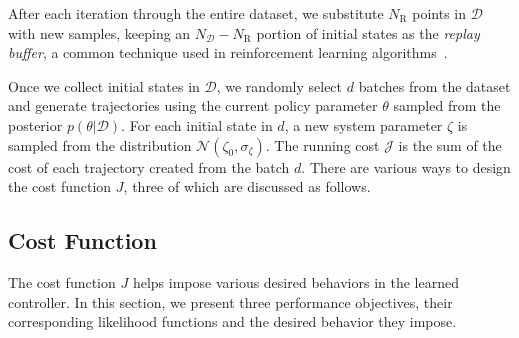 After each iteration through the entire dataset, we substitute $N_{\textrm{R}}$
points in $\mathcal{D}$ with new samples, keeping an $N_\mathcal{D} -
N_\textrm{R}$ portion of initial states as the \textit{replay buffer}, a common
technique used in reinforcement learning algorithms~\cite{lin1992self}.

Once we collect initial states in $\mathcal{D}$, we randomly select $d$ batches
from the dataset and generate trajectories using the current policy parameter
$\theta$ sampled from the posterior $p(\theta | \mathcal{D})$. For each initial
state in $d$, a new system parameter $\zeta$ is sampled from the distribution
$\mathcal{N}(\zeta_0, \sigma_\zeta)$. The running cost $\mathcal{J}$ is the sum
of the cost of each trajectory created from the batch $d$. There are various
ways to design the cost function $J$, three of which are discussed as follows.

\subsection{Cost Function}
\label{ssec:cost}

The cost function $J$ helps impose various desired behaviors in the learned
controller. In this section, we present three performance objectives, their
corresponding likelihood functions and the desired behavior they impose.

